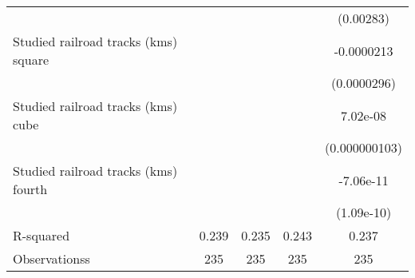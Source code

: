 {\begin{tabular}{l*{4}{c}}
                    &                     &                     &                     &   (0.00283)         \\
[1em]
Studied railroad tracks (kms) square&                     &                     &                     &  -0.0000213         \\
                    &                     &                     &                     & (0.0000296)         \\
[1em]
Studied railroad tracks (kms) cube&                     &                     &                     &    7.02e-08         \\
                    &                     &                     &                     &(0.000000103)         \\
[1em]
Studied railroad tracks (kms) fourth&                     &                     &                     &   -7.06e-11         \\
                    &                     &                     &                     &  (1.09e-10)         \\
\hline
R-squared           &       0.239         &       0.235         &       0.243         &       0.237         \\
Observationss       &         235         &         235         &         235         &         235         \\
\hline\hline
\end{tabular}
}
